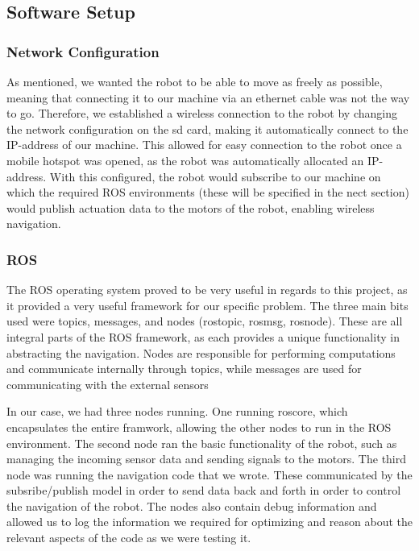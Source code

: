 \documentclass[conference]{IEEEtran}
\begin{document}
\subsection{Software Setup}

\subsubsection{Network Configuration}
As mentioned, we wanted the robot to be able to move as freely as possible, meaning that connecting it to our machine via an ethernet cable was not the way to go.
Therefore, we established a wireless connection to the robot by changing the network configuration on the sd card, making it automatically connect to the IP-address of our machine.
This allowed for easy connection to the robot once a mobile hotspot was opened, as the robot was automatically allocated an IP-address.
With this configured, the robot would subscribe to our machine on which the required ROS environments (these will be specified in the nect section) would publish actuation data to the motors of the robot, enabling wireless navigation.

\subsubsection{ROS}

The ROS operating system proved to be very useful in regards to this project, as it provided a very useful framework for our specific problem.
The three main bits used were topics, messages, and nodes (rostopic, rosmsg, rosnode). These are all integral parts of the ROS framework, as each provides a unique functionality in abstracting the navigation.
Nodes are responsible for performing computations and communicate internally through topics, while messages are used for communicating with the external sensors

In our case, we had three nodes running. One running roscore, which encapsulates the entire framwork, allowing the other nodes to run in the ROS environment.
The second node ran the basic functionality of the robot, such as managing the incoming sensor data and sending signals to the motors.
The third node was running the navigation code that we wrote. These communicated by the subsribe/publish model in order to send data back and forth in order to control the navigation of the robot.
The nodes also contain debug information and allowed us to log the information we required for optimizing and reason about the relevant aspects of the code as we were testing it.
\end{document}
